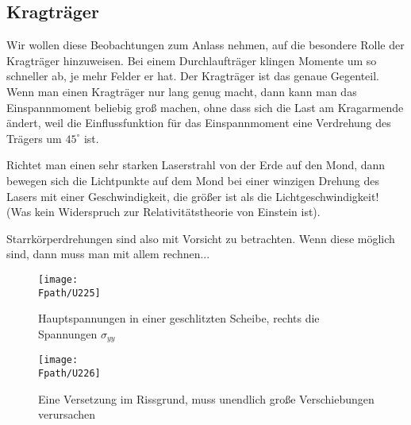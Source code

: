 {\textcolor{sectionTitleBlue}{\section{Kragtr\"{a}ger}}}
Wir wollen diese Beobachtungen zum Anlass nehmen, auf die besondere Rolle der Kragtr\"{a}ger hinzuweisen. Bei einem Durchlauftr\"{a}ger klingen Momente um so schneller ab, je mehr Felder er hat. Der Kragtr\"{a}ger ist das genaue Gegenteil. Wenn man einen Kragtr\"{a}ger nur lang genug macht, dann kann man das Einspannmoment beliebig gro{\ss} machen, ohne dass sich die Last am Kragarmende \"{a}ndert, weil die Einflussfunktion f\"{u}r das Einspannmoment eine Verdrehung des Tr\"{a}gers um $45^\circ$ ist.

Richtet man einen sehr starken Laserstrahl von der Erde auf den Mond, dann bewegen sich die Lichtpunkte auf dem Mond bei einer winzigen Drehung des Lasers mit einer Geschwindigkeit, die gr\"{o}{\ss}er ist als die Lichtgeschwindigkeit! (Was kein Widerspruch zur Relativit\"{a}tstheorie von Einstein ist).

Starrk\"{o}rperdrehungen sind also mit Vorsicht zu betrachten. Wenn diese m\"{o}glich sind, dann muss man mit allem rechnen... \\
\begin{figure}
\centering
{\texttt{[image: \\Fpath/U225]}}
\caption{Hauptspannungen in einer geschlitzten Scheibe, rechts die Spannungen $\sigma_{yy}$}
\label{U225}%
\end{figure}%
\begin{figure}
\centering
\if {} \sidecaption[t] \fi
{\texttt{[image: \\Fpath/U226]}}
\caption{Eine Versetzung im Rissgrund, muss unendlich gro{\ss}e Verschiebungen verursachen}
\label{U226}%
\end{figure}%

